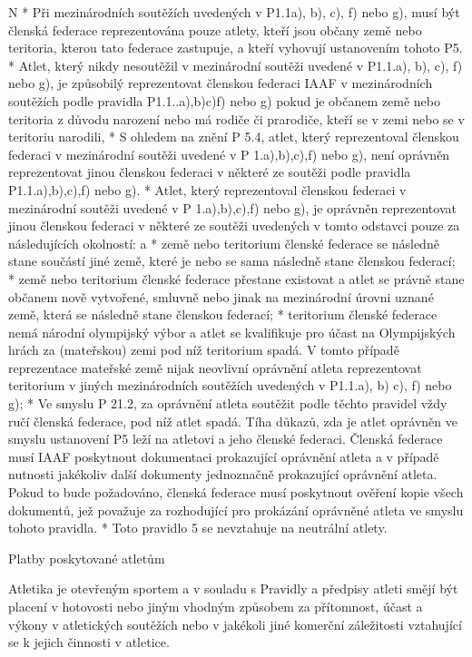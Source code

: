 \begitems \style N
* Při mezinárodních soutěžích uvedených v P1.1a), b), c), f) nebo g), musí být členská federace reprezentována pouze atlety, kteří jsou občany země nebo teritoria, kterou tato federace zastupuje, a kteří vyhovují ustanovením tohoto P5.
* Atlet, který nikdy nesoutěžil v mezinárodní soutěži uvedené v P1.1.a), b), c), f) nebo g), je způsobilý reprezentovat členskou federaci IAAF v mezinárodních soutěžích podle pravidla P1.1..a),b)c)f) nebo g) pokud je občanem země nebo teritoria z důvodu narození nebo má rodiče či prarodiče, kteří se v zemi nebo se v teritoriu narodili,
* S ohledem na znění P 5.4, atlet, který reprezentoval členskou federaci v mezinárodní soutěži uvedené v P 1.a),b),c),f) nebo g), není oprávněn reprezentovat jinou členskou federaci v některé ze soutěži podle pravidla P1.1.a),b),c),f) nebo g).
* Atlet, který reprezentoval členskou federaci v mezinárodní soutěži uvedené v P 1.a),b),c),f) nebo g), je oprávněn reprezentovat jinou členskou federaci v některé ze soutěži uvedených v tomto odstavci pouze za následujících okolností:
  \begitems \style a
  * země nebo teritorium členské federace se následně stane součástí jiné země, které je nebo se sama následně stane členskou federací;
  * země nebo teritorium členské federace přestane existovat a atlet se právně stane občanem nově vytvořené, smluvně nebo jinak na mezinárodní úrovni uznané země, která se následně stane členskou federací;
  * teritorium členské federace nemá národní olympijský výbor a atlet se kvalifikuje pro účast na Olympijských hrách za (mateřskou) zemi pod níž teritorium spadá. V tomto případě reprezentace mateřské země nijak neovlivní oprávnění atleta reprezentovat teritorium v jiných mezinárodních soutěžích uvedených v P1.1.a), b) c), f) nebo g);
  \enditems
* Ve smyslu P 21.2, za oprávnění atleta soutěžit podle těchto pravidel vždy ručí členská federace, pod níž atlet spadá. Tíha důkazů, zda je atlet oprávněn ve smyslu ustanovení P5 leží na atletovi a jeho členské federaci. Členská federace musí IAAF poskytnout dokumentaci prokazující oprávnění atleta a v případě nutnosti jakékoliv další dokumenty jednoznačně prokazující oprávnění atleta. Pokud to bude požadováno, členská federace musí poskytnout ověření kopie všech dokumentů, jež považuje za rozhodující pro prokázání oprávněné atleta ve smyslu tohoto pravidla.
* Toto pravidlo 5 se nevztahuje na neutrální atlety.
\enditems

\secc Platby poskytované atletům

Atletika je otevřeným sportem a v souladu s Pravidly a předpisy atleti smějí být placení v hotovosti nebo jiným vhodným způsobem za přítomnost, účast a výkony v atletických soutěžích nebo v jakékoli jiné komerční záležitosti vztahující se k jejich činnosti v atletice.


